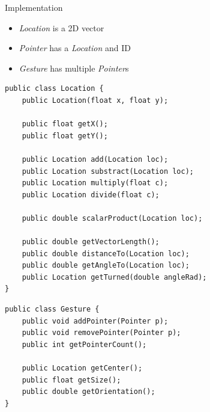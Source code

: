 \documentclass[t]{beamer}
\begin{document}
\begin{frame}{Implementation}
\footnotesize
\begin{itemize}
	\item \textit{Location} is a 2D vector
	\item \textit{Pointer} has a \textit{Location} and ID
	\item \textit{Gesture} has multiple \textit{Pointer}s
\end{itemize}

\begin{lstlisting}
public class Location {
	public Location(float x, float y);
	
	public float getX();
	public float getY();
	
	public Location add(Location loc);
	public Location substract(Location loc);
	public Location multiply(float c);
	public Location divide(float c);
	
	public double scalarProduct(Location loc);
	
	public double getVectorLength();
	public double distanceTo(Location loc);
	public double getAngleTo(Location loc);
	public Location getTurned(double angleRad);
}
\end{lstlisting}
\begin{lstlisting}
public class Gesture {
	public void addPointer(Pointer p);
	public void removePointer(Pointer p);
	public int getPointerCount();
	
	public Location getCenter();
	public float getSize();
	public double getOrientation();
}
\end{lstlisting}
\end{frame}
\end{document}

